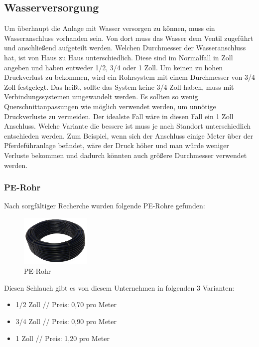 \subsection{Wasserversorgung}
\label{sec:wasserversorgung}

Um überhaupt die Anlage mit Wasser versorgen zu können, muss ein Wasseranschluss vorhanden sein. Von dort muss das Wasser dem Ventil zugeführt und anschließend aufgeteilt werden. Welchen Durchmesser der Wasseranschluss hat, ist von Haus zu Haus unterschiedlich. Diese sind im Normalfall in Zoll angeben und haben entweder 1/2, 3/4 oder 1 Zoll. Um keinen zu hohen Druckverlust zu bekommen, wird ein Rohrsystem mit einem Durchmesser von 3/4 Zoll festgelegt. Das heißt, sollte das System keine 3/4 Zoll haben, muss mit Verbindungssystemen umgewandelt werden. Es sollten so wenig Querschnittanpassungen wie möglich verwendet werden, um unnötige Druckverluste zu vermeiden. Der idealste Fall wäre in diesen Fall ein 1 Zoll Anschluss. Welche Variante die bessere ist muss je nach Standort unterschiedlich entschieden werden. Zum Beispiel, wenn sich der Anschluss einige Meter über der Pferdeführanlage befindet, wäre der Druck höher und man würde weniger Verluste bekommen und dadurch könnten auch größere Durchmesser verwendet werden. \\ 


\subsubsection{PE-Rohr}
\label{sec:peRohr}

Nach sorgfältiger Recherche wurden folgende PE-Rohre gefunden:\\

\begin{figure}[H]
\begin{center}
	\includegraphics[width=0.3\textwidth]{fig/PEROHR}
	\caption{PE-Rohr}
\end{center}
\end{figure}

Diesen Schlauch gibt es von diesem Unternehmen in folgenden 3 Varianten: \cite{preisRohr}

\begin{itemize}
	\item{1/2 Zoll // Preis: 0,70\textsf{\texteuro} pro Meter}
	\item{3/4 Zoll // Preis: 0,90\textsf{\texteuro} pro Meter}
	\item{1 Zoll // Preis: 1,20\textsf{\texteuro} pro Meter}
\end{itemize}

